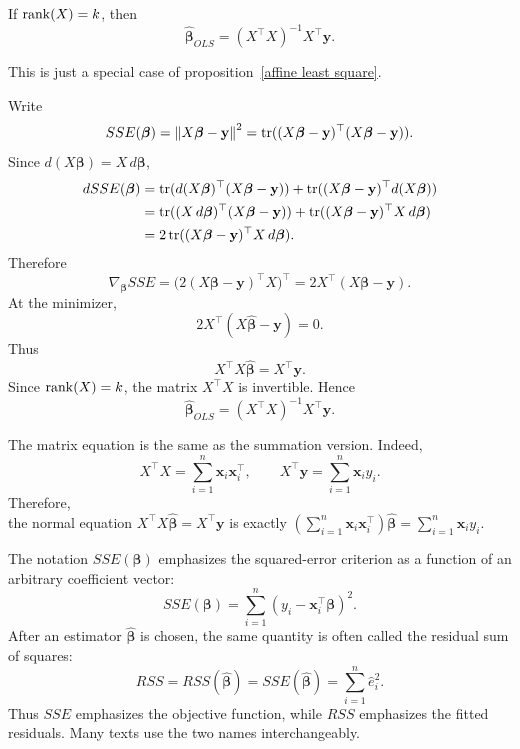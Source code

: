 \begin{theorem}
If $\operatorname{rank}(X)=k$, then
\[
    \widehat{\boldsymbol{\beta}}_{OLS}=(X^{\top}X)^{-1}X^{\top}\mathbf{y}.
\]
\end{theorem}

\begin{remark}
    This is just a special case of proposition~\eqref{affine least square}.
\end{remark}

\begin{pfbox}
Write
\[
    SSE(\boldsymbol{\beta})= \left\lVert X\boldsymbol{\beta}-\mathbf{y} \right\rVert^2 = \operatorname{tr}((X\boldsymbol{\beta}-\mathbf{y})^{\top}(X\boldsymbol{\beta}-\mathbf{y})).
\]
Since $d(X\boldsymbol{\beta})=X\,d\boldsymbol{\beta}$,
\[
\begin{aligned}
    dSSE(\boldsymbol{\beta})
    &=
    \operatorname{tr}(d(X\boldsymbol{\beta})^{\top}(X\boldsymbol{\beta}-\mathbf{y}))
    +
    \operatorname{tr}((X\boldsymbol{\beta}-\mathbf{y})^{\top}d(X\boldsymbol{\beta}))\\
    &=
    \operatorname{tr}((X\,d\boldsymbol{\beta})^{\top}(X\boldsymbol{\beta}-\mathbf{y}))
    +
    \operatorname{tr}((X\boldsymbol{\beta}-\mathbf{y})^{\top}X\,d\boldsymbol{\beta})\\
    &=
    2\operatorname{tr}((X\boldsymbol{\beta}-\mathbf{y})^{\top}X\,d\boldsymbol{\beta}).
\end{aligned}
\]
Therefore
\[
    \nabla_{\boldsymbol{\beta}} SSE
    =
    \bigl(2(X\boldsymbol{\beta}-\mathbf{y})^{\top}X\bigr)^{\top}
    =
    2X^{\top}(X\boldsymbol{\beta}-\mathbf{y}).
\]
At the minimizer,
\[
    2X^{\top}(X\widehat{\boldsymbol{\beta}}-\mathbf{y})=0.
\]
Thus
\[
    X^{\top}X\widehat{\boldsymbol{\beta}}=X^{\top}\mathbf{y}.
\]
Since $\operatorname{rank}(X)=k$, the matrix $X^{\top}X$ is invertible. Hence
\[
    \widehat{\boldsymbol{\beta}}_{OLS}=(X^{\top}X)^{-1}X^{\top}\mathbf{y}.
\]

The matrix equation is the same as the summation version. Indeed,
\[
    X^{\top}X=\sum_{i=1}^n \mathbf{x}_i\mathbf{x}_i^{\top},
    \qquad
    X^{\top}\mathbf{y}=\sum_{i=1}^n \mathbf{x}_i y_i.
\]
Therefore,\\
the normal equation $X^{\top}X\widehat{\boldsymbol{\beta}}=X^{\top}\mathbf{y}$ is exactly $\left(\displaystyle\sum_{i=1}^n \mathbf{x}_i\mathbf{x}_i^{\top}\right)\widehat{\boldsymbol{\beta}}=\displaystyle\sum_{i=1}^n \mathbf{x}_i y_i$.
\end{pfbox}

\begin{remark}
The notation $SSE(\boldsymbol{\beta})$ emphasizes the squared-error criterion as
a function of an arbitrary coefficient vector:
\[
    SSE(\boldsymbol{\beta})
    =
    \sum_{i=1}^n
    (y_i-\mathbf{x}_i^{\top}\boldsymbol{\beta})^2.
\]
After an estimator $\widehat{\boldsymbol{\beta}}$ is chosen, the same quantity
is often called the residual sum of squares:
\[
    RSS
    =
    RSS(\widehat{\boldsymbol{\beta}})
    =
    SSE(\widehat{\boldsymbol{\beta}})
    =
    \sum_{i=1}^n \widehat e_i^2.
\]
Thus $SSE$ emphasizes the objective function, while $RSS$ emphasizes the fitted
residuals. Many texts use the two names interchangeably.
\end{remark}





